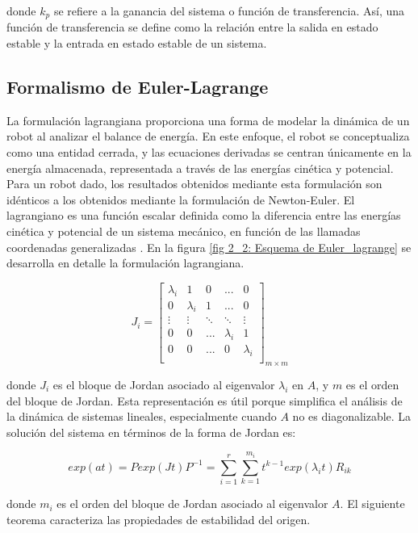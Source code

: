 donde $k_{p}$ se refiere a la ganancia del sistema o función de transferencia. Así, una función de transferencia se define como la relación entre la salida en estado estable y la entrada en estado estable de un sistema.

 
\subsection{Formalismo de Euler-Lagrange}

La formulación lagrangiana proporciona una forma de modelar la dinámica de un robot al analizar el balance de energía. En este enfoque, el robot se conceptualiza como una entidad cerrada, y las ecuaciones derivadas se centran únicamente en la energía almacenada, representada a través de las energías cinética y potencial. Para un robot dado, los resultados obtenidos mediante esta formulación son idénticos a los obtenidos mediante la formulación de Newton-Euler.
El lagrangiano es una función escalar definida como la diferencia entre las energías cinética y potencial de un sistema mecánico, en función de las llamadas coordenadas generalizadas \cite{torres2002robots}. En la figura \ref{fig 2_2: Esquema de Euler_lagrange} se desarrolla en detalle la formulación lagrangiana.


\begin{equation}
J_{i}=
    \begin{bmatrix}
        \lambda_{i} & 1           & 0      &...  & 0  \\
        0           & \lambda_{i} & 1      & ...& 0 \\
        \vdots      & \vdots      & \ddots & \ddots & \vdots \\
             0   &    0    &  ... & \lambda_{i} & 1   \\
           0 &   0   &  ...       &  0   & \lambda_{i} \\
    \end{bmatrix}_{m \times m}
\end{equation}

donde $J_{i}$ es el bloque de Jordan asociado al eigenvalor $\lambda_{i}$ en $A$, y $m$ es el orden del bloque de Jordan. Esta representación es útil porque simplifica el análisis de la dinámica de sistemas lineales, especialmente cuando $A$ no es diagonalizable. La solución del sistema en términos de la forma de Jordan es:

\begin{equation}
     exp(at) = P exp(Jt) P^{-1} = \sum_{i=1}^{r}\sum_{k=1}^{m_{i}}t^{k-1}exp(\lambda_{i}t)R_{ik}
\end{equation}

donde $m_{i}$ es el orden del bloque de Jordan asociado al eigenvalor $A$. El siguiente teorema caracteriza las propiedades de estabilidad del origen.
